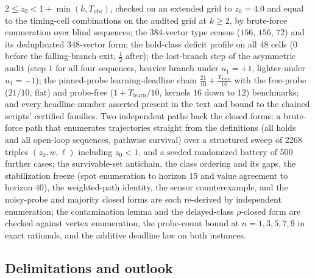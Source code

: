 \documentclass[10pt,twocolumn]{article}
\theoremstyle{plain}
\theoremstyle{definition}
\theoremstyle{remark}
\begin{document}
\(2 \le z_{0} < 1 + \min(k, T_{\mathrm{obs}})\), checked on an
extended grid to \(z_{0} = 4.0\) and equal to the timing-cell
combinations on the audited grid at \(k \ge 2\), by brute-force
enumeration over blind sequences; the \(384\)-vector type census
(\(156\), \(156\), \(72\)) and its deduplicated \(348\)-vector
form; the hold-class deficit profile on all 48 cells (\(0\) before the
falling-branch exit, \(\tfrac{1}{2}\) after); the lost-branch step of
the asymmetric audit (step \(1\) for all four sequences, heavier
branch under \(u_{1} = +1\), lighter under \(u_{1} = -1\)); the
pinned-probe learning-deadline chain
\(\tfrac{21}{10} + \tfrac{T_{\mathrm{learn}}}{10}\) with the
free-probe (\(21/10\), flat) and probe-free
(\(1 + T_{\mathrm{learn}}/10\), kernels \(16\) down to \(12\))
benchmarks; and every headline
number asserted present in the text and bound to the chained scripts'
certified families. Two independent paths back the closed forms: a
brute-force path that enumerates trajectories straight from the
definitions (all holds and all open-loop sequences, pathwise survival)
over a structured sweep of 2268 triples
\((z_{0}, w, \ell)\) including \(z_{0} < 1\), and a seeded
randomized battery of 500 further cases; the survivable-set antichain,
the class ordering and its gaps, the stabilization freeze (spot
enumeration to horizon \(15\) and value agreement to horizon
\(40\)), the weighted-path identity, the sensor counterexample, and
the noisy-probe and majority closed forms are each re-derived by
independent enumeration; the contamination lemma and the delayed-class
\(\rho\)-closed form are checked against vertex enumeration, the
probe-count bound at \(n = 1, 3, 5, 7, 9\) in exact rationals, and the
additive deadline law on both instances.

\subsection{Delimitations and outlook}\label{scope}
\end{document}
